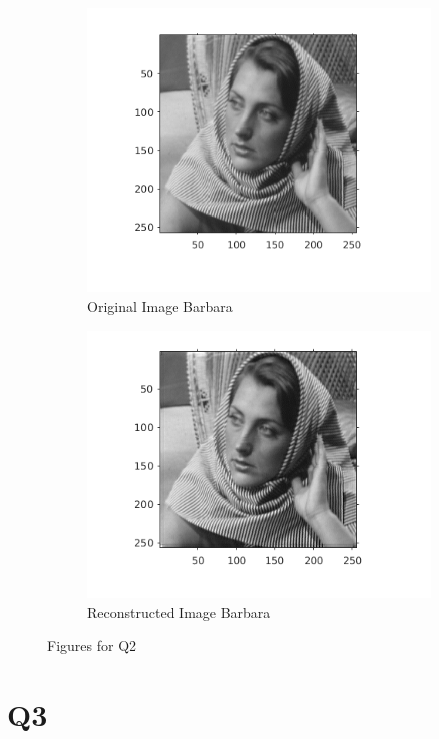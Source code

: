 \documentclass{article}
\begin{document}
\begin{figure}[h!]
  \begin{subfigure}[t]{0.5\textwidth}
    \centering
    \includegraphics[scale=0.5]{images/original_image_barbara}
    \caption{Original Image Barbara}
    \label{Fig :1a}
  \end{subfigure}
  \begin{subfigure}[t]{0.5\textwidth}
    \centering
    \includegraphics[scale=0.5]{images/phi_reconstructed_barbara}
    \caption{Reconstructed Image Barbara}
    \label{Fig :1b}
  \end{subfigure}
  \caption{Figures for Q2}
\end{figure}



\section*{Q3}
\end{document}
